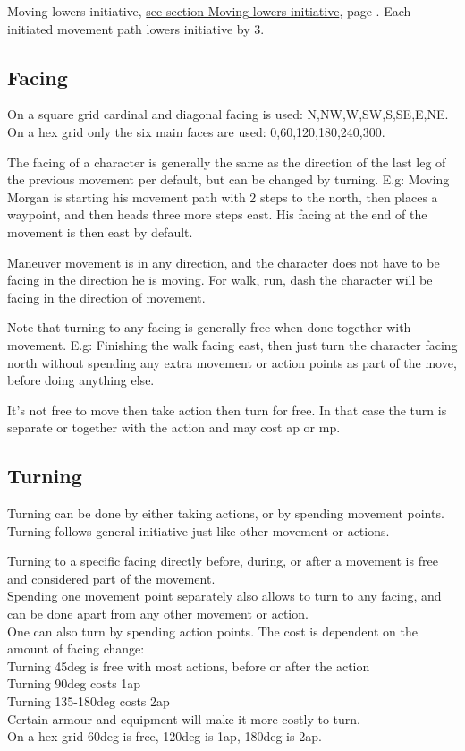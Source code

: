 Moving lowers initiative, \hyperref[sec:movinglowersinitiative]{see section Moving lowers initiative}, page \pageref{sec:movinglowersinitiative}. Each initiated movement path lowers initiative by 3.


\subsection*{Facing}
On a square grid cardinal and diagonal facing is used: N,NW,W,SW,S,SE,E,NE.
On a hex grid only the six main faces are used: 0,60,120,180,240,300\degree.

The facing of a character is generally the same as the direction of the last leg of the previous movement per default, but can be changed by turning. E.g: Moving Morgan is starting his movement path with 2 steps to the north, then places a waypoint, and then heads three more steps east. His facing at the end of the movement is then east by default.

Maneuver movement is in any direction, and the character does not have to be facing in the direction he is moving. For walk, run, dash the character will be facing in the direction of movement.

Note that turning to any facing is generally free when done together with movement. E.g: Finishing the walk facing east, then just turn the character facing north without spending any extra movement or action points as part of the move, before doing anything else.

It's not free to move then take action then turn for free. In that case the turn is separate or together with the action and may cost ap or mp.


\subsection*{Turning}
Turning can be done by either taking actions, or by spending movement points. Turning follows general initiative just like other movement or actions.

Turning to a specific facing directly before, during, or after a movement is free and considered part of the movement. \\
Spending one movement point separately also allows to turn to any facing, and can be done apart from any other movement or action. \\
One can also turn by spending action points. The cost is dependent on the amount of facing change: \\
Turning 45deg is free with most actions, before or after the action \\
Turning 90deg costs 1ap \\
Turning 135-180deg costs 2ap \\
Certain armour and equipment will make it more costly to turn.\\
On a hex grid 60deg is free, 120deg is 1ap, 180deg is 2ap.

